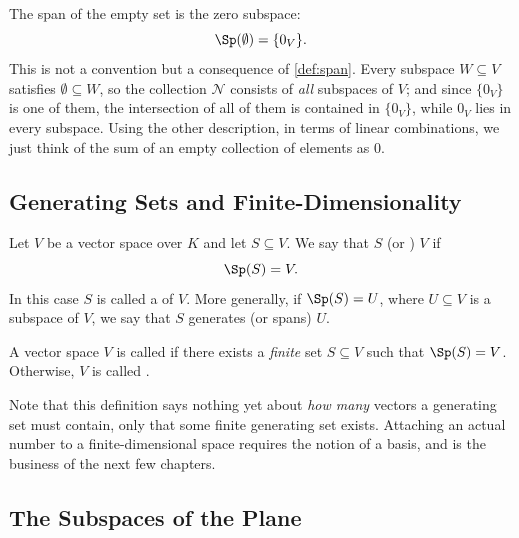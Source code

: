 \begin{remark}
\label{rem:span_of_empty_set}
The span of the empty set is the zero subspace:
\[
\Sp(\emptyset) = \{0_V\}.
\]
This is not a convention but a consequence of \cref{def:span}. Every subspace $W \subseteq V$ satisfies $\emptyset \subseteq W$, so the collection $\mathcal{N}$ consists of \emph{all} subspaces of $V$; and since $\{0_V\}$ is one of them, the intersection of all of them is contained in $\{0_V\}$, while $0_V$ lies in every subspace. Using the other description, in terms of linear combinations, we just think of the sum of an empty collection of elements as $0$.
\end{remark}

\subsection{Generating Sets and Finite-Dimensionality}

\begin{definition}
\label{def:generating_set}
Let $V$ be a vector space over $K$ and let $S \subseteq V$. We say that $S$  (or ) $V$ if
\[
\Sp(S) = V.
\]
In this case $S$ is called a  of $V$. More generally, if $\Sp(S) = U$, where $U \subseteq V$ is a subspace of $V$, we say that $S$ generates (or spans) $U$.
\end{definition}

\begin{definition}
\label{def:finite_dimensional}
A vector space $V$ is called  if there exists a \emph{finite} set $S \subseteq V$ such that $\Sp(S) = V$. Otherwise, $V$ is called .
\end{definition}

\begin{importantremark}
\label{rem:finite_dim_no_number_yet}
Note that this definition says nothing yet about \emph{how many} vectors a generating set must contain, only that some finite generating set exists. Attaching an actual number to a finite-di\-men\-sional space requires the notion of a basis, and is the business of the next few chapters.
\end{importantremark}

\subsection{The Subspaces of the Plane}

